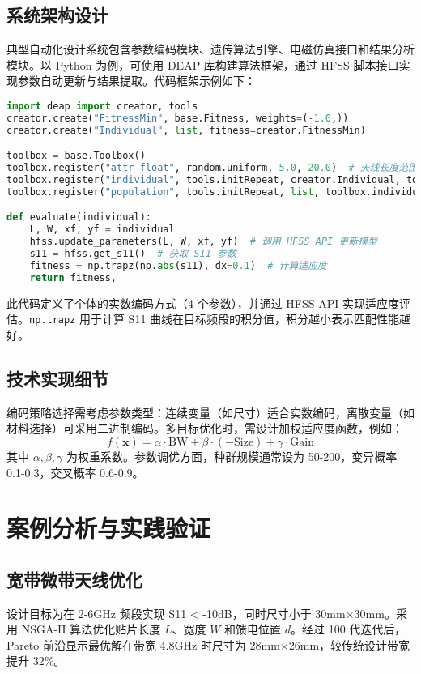 \section{系统架构设计}
典型自动化设计系统包含参数编码模块、遗传算法引擎、电磁仿真接口和结果分析模块。以 Python 为例，可使用 DEAP 库构建算法框架，通过 HFSS 脚本接口实现参数自动更新与结果提取。代码框架示例如下：\par
\begin{lstlisting}[language=python]
import deap import creator, tools
creator.create("FitnessMin", base.Fitness, weights=(-1.0,))
creator.create("Individual", list, fitness=creator.FitnessMin)

toolbox = base.Toolbox()
toolbox.register("attr_float", random.uniform, 5.0, 20.0)  # 天线长度范围 5-20mm
toolbox.register("individual", tools.initRepeat, creator.Individual, toolbox.attr_float, n=4)
toolbox.register("population", tools.initRepeat, list, toolbox.individual)

def evaluate(individual):
    L, W, xf, yf = individual
    hfss.update_parameters(L, W, xf, yf)  # 调用 HFSS API 更新模型
    s11 = hfss.get_s11()  # 获取 S11 参数
    fitness = np.trapz(np.abs(s11), dx=0.1)  # 计算适应度
    return fitness,
\end{lstlisting}
此代码定义了个体的实数编码方式（4 个参数），并通过 HFSS API 实现适应度评估。\verb!np.trapz! 用于计算 S11 曲线在目标频段的积分值，积分越小表示匹配性能越好。\par
\section{技术实现细节}
编码策略选择需考虑参数类型：连续变量（如尺寸）适合实数编码，离散变量（如材料选择）可采用二进制编码。多目标优化时，需设计加权适应度函数，例如：
$$ f(\mathbf{x}) = \alpha \cdot \text{BW} + \beta \cdot (-\text{Size}) + \gamma \cdot \text{Gain} $$
其中 $\alpha, \beta, \gamma$ 为权重系数。参数调优方面，种群规模通常设为 50-200，变异概率 0.1-0.3，交叉概率 0.6-0.9。\par
\chapter{案例分析与实践验证}
\section{宽带微带天线优化}
设计目标为在 2-6GHz 频段实现 S11 < -10dB，同时尺寸小于 30mm×30mm。采用 NSGA-II 算法优化贴片长度 $L$、宽度 $W$ 和馈电位置 $d$。经过 100 代迭代后，Pareto 前沿显示最优解在带宽 4.8GHz 时尺寸为 28mm×26mm，较传统设计带宽提升 32\%{}。\par
